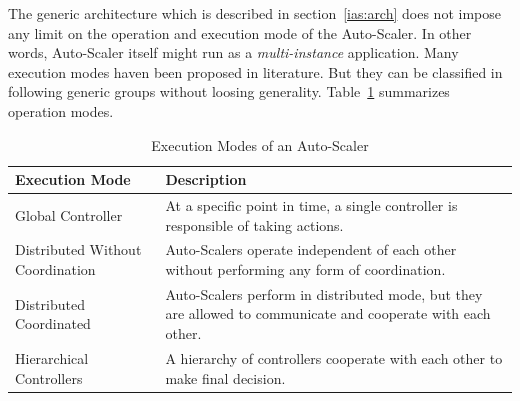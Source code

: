 The generic architecture which is described in section~\ref{ias:arch} does not impose any limit on the operation and execution mode of the Auto-Scaler. In other words, Auto-Scaler itself might run as a \emph{multi-instance} application. Many execution modes haven been proposed in literature. But they can be classified in following generic groups without loosing generality. Table~\ref{tab:exec-mode} summarizes operation modes. 
\begin{table}[h]
    \begin{tabularx}{\textwidth}{lX}
        \toprule
        \textbf{Execution Mode} & \textbf{Description}\\
        \midrule
        Global Controller & At a specific point in time, a single controller is responsible of taking actions.\\
        Distributed Without Coordination & Auto-Scalers operate independent of each other without performing any form of coordination.\\
        Distributed Coordinated & Auto-Scalers perform in distributed mode, but they are allowed to communicate and cooperate with each other.\\
        Hierarchical Controllers & A hierarchy of controllers cooperate with each other to make final decision.\\
        \bottomrule
    \end{tabularx}
    \centering
    \caption{Execution Modes of an Auto-Scaler}
    \label{tab:exec-mode}
\end{table}
\clearpage
